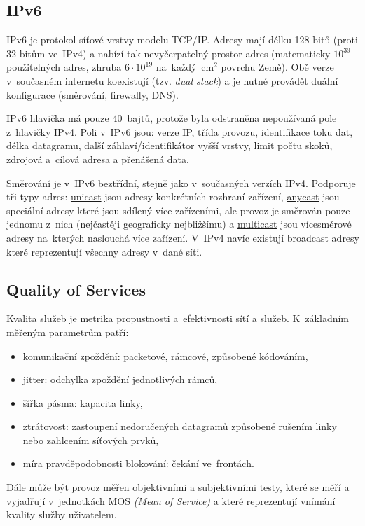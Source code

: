 \subsection{IPv6}

IPv6 je protokol síťové vrstvy modelu TCP/IP.
Adresy mají délku 128 bitů (proti 32 bitům ve~IPv4) a nabízí tak nevyčerpatelný prostor adres (matematicky $10^{39}$ použitelných adres, zhruba $6 \cdot 10^{19}$ na~každý~cm$^2$ povrchu Země).
Obě verze v~současném internetu koexistují (tzv. \emph{dual stack}) a je nutné provádět duální konfigurace (směrování, firewally, DNS).

IPv6 hlavička má pouze 40~bajtů, protože byla odstraněna nepoužívaná pole z~hlavičky IPv4.
Poli v~IPv6 jsou: verze IP, třída provozu, identifikace toku dat, délka datagramu, další záhlaví/identifikátor vyšší vrstvy, limit počtu skoků, zdrojová a~cílová adresa a přenášená data.

Směrování je v~IPv6 beztřídní, stejně jako v~současných verzích IPv4.
Podporuje tři typy adres: \underline{unicast} jsou adresy konkrétních rozhraní zařízení, \underline{anycast} jsou speciální adresy které jsou sdílený více zařízeními, ale provoz je směrován pouze jednomu z~nich (nejčastěji geograficky nejbližšímu) a \underline{multicast} jsou vícesměrové adresy na~kterých naslouchá více zařízení.
V~IPv4 navíc existují broadcast adresy které reprezentují všechny adresy v~dané síti.


\subsection{Quality of Services}

Kvalita služeb je metrika propustnosti a~efektivnosti sítí a služeb.
K~základním měřeným parametrům patří:
\begin{itemize}
    \item komunikační zpoždění: packetové, rámcové, způsobené kódováním,
    \item jitter: odchylka zpoždění jednotlivých rámců,
    \item šířka pásma: kapacita linky,
    \item ztrátovost: zastoupení nedoručených datagramů způsobené rušením linky nebo zahlcením síťových prvků,
    \item míra pravděpodobnosti blokování: čekání ve~frontách.
\end{itemize}

Dále může být provoz měřen objektivními a subjektivními testy, které se měří a vyjadřují v~jednotkách MOS \emph{(Mean of Service)} a které reprezentují vnímání kvality služby uživatelem.

